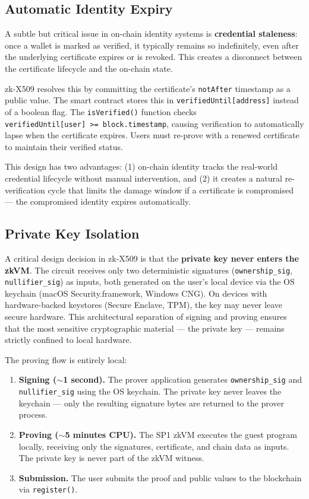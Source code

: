 \documentclass[11pt, a4paper]{article}
\providecommand{\tightlist}{%
  \setlength{\itemsep}{0pt}\setlength{\parskip}{0pt}}
\begin{document}
\subsection{Automatic Identity
Expiry}\label{automatic-identity-expiry}

A subtle but critical issue in on-chain identity systems is
\textbf{credential staleness}: once a wallet is marked as verified, it
typically remains so indefinitely, even after the underlying certificate
expires or is revoked. This creates a disconnect between the certificate
lifecycle and the on-chain state.

zk-X509 resolves this by committing the certificate's \texttt{notAfter}
timestamp as a public value. The smart contract stores this in
\texttt{verifiedUntil{[}address{]}} instead of a boolean flag. The
\texttt{isVerified()} function checks
\texttt{verifiedUntil{[}user{]}\ \textgreater{}=\ block.timestamp},
causing verification to automatically lapse when the certificate
expires. Users must re-prove with a renewed certificate to maintain
their verified status.

This design has two advantages: (1) on-chain identity tracks the
real-world credential lifecycle without manual intervention, and (2) it
creates a natural re-verification cycle that limits the damage window if
a certificate is compromised --- the compromised identity expires
automatically.

\subsection{Private Key Isolation}\label{private-key-isolation}

A critical design decision in zk-X509 is that the \textbf{private key
never enters the zkVM}. The circuit receives only two deterministic
signatures (\texttt{ownership\_sig}, \texttt{nullifier\_sig}) as inputs,
both generated on the user's local device via the OS keychain (macOS
Security.framework, Windows CNG). On devices with hardware-backed
keystores (Secure Enclave, TPM), the key may never leave secure
hardware. This architectural
separation of signing and proving ensures that the most sensitive
cryptographic material --- the private key --- remains strictly confined
to local hardware.

The proving flow is entirely local:

\begin{enumerate}
\def\labelenumi{\arabic{enumi}.}
\tightlist
\item
  \textbf{Signing ($\sim$1 second).} The prover application
  generates \texttt{ownership\_sig} and \texttt{nullifier\_sig} using
  the OS keychain. The private key never leaves the keychain --- only the resulting signature bytes are returned to the prover process.
\item
  \textbf{Proving ($\sim$5 minutes CPU).} The SP1 zkVM
  executes the guest program locally, receiving only the signatures,
  certificate, and chain data as inputs. The private key is never part
  of the zkVM witness.
\item
  \textbf{Submission.} The user submits the proof and public values to
  the blockchain via \texttt{register()}.
\end{enumerate}
\end{document}
